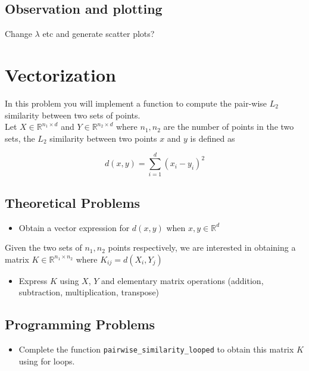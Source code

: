 \documentclass{article}
\begin{document}
\subsection{Observation and plotting}
Change $\lambda$ etc and generate scatter plots?

\section{Vectorization}
In this problem you will implement a function to compute the pair-wise $L_2$ similarity between two sets of points. \\
Let $X \in \mathbb{R}^{n_1 \times d}$ and $Y \in \mathbb{R}^{n_2 \times d}$ where $n_1, n_2$ are the number of points in the two sets, the $L_2$ similarity between two points $x$ and $y$ is defined as 

\begin{equation*}
    d(x,y) = \sum_{i=1}^d (x_i - y_i)^2
\end{equation*}

\subsection{Theoretical Problems}

\begin{itemize}[leftmargin=*]
\item Obtain a vector expression for $d(x,y)$ when $x , y \in \mathbb{R}^d$
\end{itemize}

Given the two sets of $n_1, n_2$ points respectively, we are interested in obtaining a matrix $K \in \mathbb{R}^{n_1 \times n_2}$ where $K_{ij} = d(X_i,Y_j)$
\begin{itemize}[leftmargin=*]
\item Express $K$ using $X$, $Y$ and elementary matrix operations (addition, subtraction, multiplication, transpose)
\end{itemize}
\subsection{Programming Problems}
\begin{itemize}[leftmargin=*]
\item Complete the function \texttt{pairwise\_similarity\_looped} to obtain this matrix $K$ using for loops. 
\end{itemize}
\end{document}
